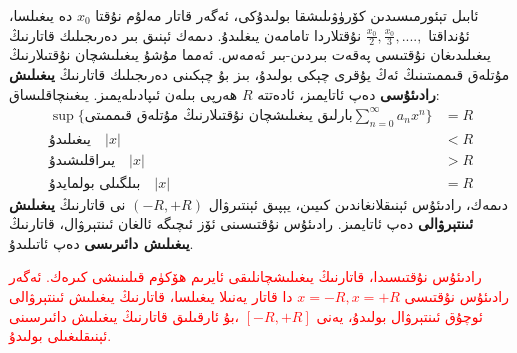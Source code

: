 ئابىل تېئورمىسىدىن كۆرۈۋىلىشقا بولىدۇكى، ئەگەر قاتار مەلۇم نۇقتا 
$x_0$
دە يىغىلسا، ئۇنداقتا
$\frac{x_0}{2}, \frac{x_0}{3}, .... , $
نۇقتلاردا تامامەن يىغلىدۇ. دىمەك ئېنىق بىر دەرىجىلىك قاتارنىڭ يىغىلىدىغان نۇقتىسى پەقەت بىردىن-بىر ئەمەس. ئەمما مۇشۇ يىغىلىشچان نۇقتىلارنىڭ مۇتلەق قىممىتىنىڭ ئەڭ يۇقرى چېكى بولىدۇ، بىز بۇ چېكىنى دەرىجىلىك قاتارنىڭ 
\textbf{يىغىلىش رادىئۇسى}
دەپ ئاتايمىز، ئادەتتە $R$ ھەرپى بىلەن ئىپادىلەيمىز. يىغىنچاقلىساق:
\begin{align*}
	\sup\{ \text{بارلىق يىغىلىشچان نۇقتىلارنىڭ مۇتلەق قىممىتى} \sum\limits_{n=0}^\infty a_n x^n \} &= R\\
	\text{يىغىلىدۇ}  \quad |x| &< R \\
	\text{يىراقلىشىدۇ} \quad |x| &> R \\
	\text{بىلگىلى بولمايدۇ} \quad |x| &= R
\end{align*}
دىمەك، رادىئۇس ئېنىقلانغاندىن كىيىن، يېپىق ئېنتىرۋال 
$(-R,+R)$
نى قاتارنىڭ 
\textbf{يىغىلىش ئىنتېرۋالى}
دەپ ئاتايمىز. رادىئۇس نۇقتىسىنى ئۆز ئىچىگە ئالغان ئىنتېرۋال، قاتارنىڭ
\textbf{يىغىلىش دائىرىسى}
دەپ ئاتىلىدۇ.

\textcolor{red}{رادىئۇس نۇقتىسىدا، قاتارنىڭ يىغىلىشچانلىقى ئايرىم ھۆكۈم قىلىنىشى كىرەك. ئەگەر رادىئۇس نۇقتىسى
$x=-R,x=+R$
دا قاتار يەنىلا يىغىلسا، قاتارنىڭ يىغىلىش ئىنتېرۋالى ئوچۇق ئىنتېرۋال بولىدۇ، يەنى 
$[-R,+R]$
،بۇ ئارقىلىق قاتارنىڭ يىغىلىش دائىرسىنى ئېنىقلىغىلى بولىدۇ.}

